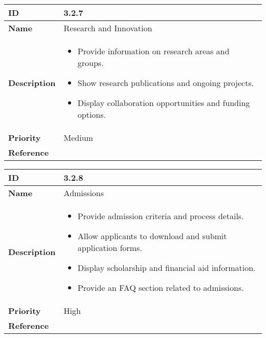 \begin{center}
\begin{tabular}{ | >{\bfseries}m{5em} | m{10cm} |  } 
  \hline
  ID & 3.2.7\\  
  \hline
  Name & Research and Innovation \\  
  \hline
  Description & 
  \begin{itemize}
      \item Provide information on research areas and groups.
      \item Show research publications and ongoing projects.
      \item Display collaboration opportunities and funding options.
  \end{itemize} \\ 
  \hline
  Priority & Medium\\
  \hline 
  Reference & \\
  \hline
\end{tabular}
\end{center}

\vspace{0.5cm}


\begin{center}
\begin{tabular}{ | >{\bfseries}m{5em} | m{10cm} |  } 
  \hline
  ID & 3.2.8\\  
  \hline
  Name & Admissions \\  
  \hline
  Description & 
  \begin{itemize}
      \item Provide admission criteria and process details.
      \item Allow applicants to download and submit application forms.
      \item Display scholarship and financial aid information.
      \item Provide an FAQ section related to admissions.
  \end{itemize} \\  
  \hline
  Priority & High\\
  \hline 
  Reference & \\
  \hline
\end{tabular}
\end{center}

\vspace{0.5cm}


